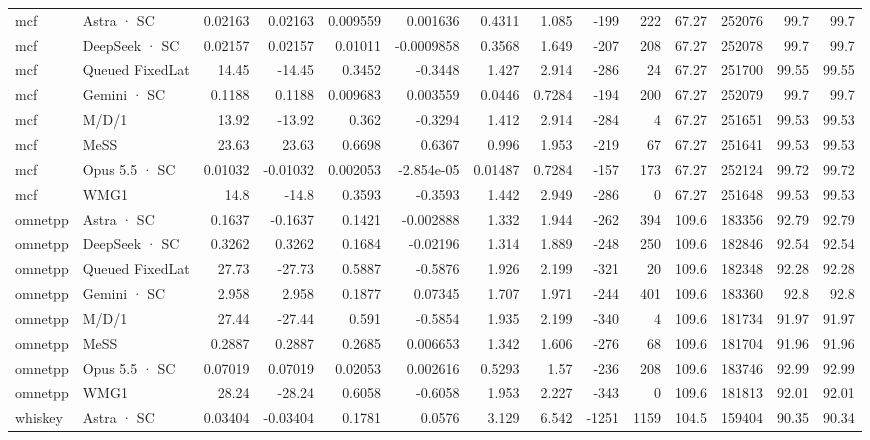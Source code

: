 \begin{tabular}{llrrrrrrrrrrrr}
mcf & Astra · SC & 0.02163 & 0.02163 & 0.009559 & 0.001636 & 0.4311 & 1.085 & -199 & 222 & 67.27 & 252076 & 99.7 & 99.7 \\
mcf & DeepSeek · SC & 0.02157 & 0.02157 & 0.01011 & -0.0009858 & 0.3568 & 1.649 & -207 & 208 & 67.27 & 252078 & 99.7 & 99.7 \\
mcf & Queued FixedLat & 14.45 & -14.45 & 0.3452 & -0.3448 & 1.427 & 2.914 & -286 & 24 & 67.27 & 251700 & 99.55 & 99.55 \\
mcf & Gemini · SC & 0.1188 & 0.1188 & 0.009683 & 0.003559 & 0.0446 & 0.7284 & -194 & 200 & 67.27 & 252079 & 99.7 & 99.7 \\
mcf & M/D/1 & 13.92 & -13.92 & 0.362 & -0.3294 & 1.412 & 2.914 & -284 & 4 & 67.27 & 251651 & 99.53 & 99.53 \\
mcf & MeSS & 23.63 & 23.63 & 0.6698 & 0.6367 & 0.996 & 1.953 & -219 & 67 & 67.27 & 251641 & 99.53 & 99.53 \\
mcf & Opus 5.5 · SC & 0.01032 & -0.01032 & 0.002053 & -2.854e-05 & 0.01487 & 0.7284 & -157 & 173 & 67.27 & 252124 & 99.72 & 99.72 \\
mcf & WMG1 & 14.8 & -14.8 & 0.3593 & -0.3593 & 1.442 & 2.949 & -286 & 0 & 67.27 & 251648 & 99.53 & 99.53 \\
omnetpp & Astra · SC & 0.1637 & -0.1637 & 0.1421 & -0.002888 & 1.332 & 1.944 & -262 & 394 & 109.6 & 183356 & 92.79 & 92.79 \\
omnetpp & DeepSeek · SC & 0.3262 & 0.3262 & 0.1684 & -0.02196 & 1.314 & 1.889 & -248 & 250 & 109.6 & 182846 & 92.54 & 92.54 \\
omnetpp & Queued FixedLat & 27.73 & -27.73 & 0.5887 & -0.5876 & 1.926 & 2.199 & -321 & 20 & 109.6 & 182348 & 92.28 & 92.28 \\
omnetpp & Gemini · SC & 2.958 & 2.958 & 0.1877 & 0.07345 & 1.707 & 1.971 & -244 & 401 & 109.6 & 183360 & 92.8 & 92.8 \\
omnetpp & M/D/1 & 27.44 & -27.44 & 0.591 & -0.5854 & 1.935 & 2.199 & -340 & 4 & 109.6 & 181734 & 91.97 & 91.97 \\
omnetpp & MeSS & 0.2887 & 0.2887 & 0.2685 & 0.006653 & 1.342 & 1.606 & -276 & 68 & 109.6 & 181704 & 91.96 & 91.96 \\
omnetpp & Opus 5.5 · SC & 0.07019 & 0.07019 & 0.02053 & 0.002616 & 0.5293 & 1.57 & -236 & 208 & 109.6 & 183746 & 92.99 & 92.99 \\
omnetpp & WMG1 & 28.24 & -28.24 & 0.6058 & -0.6058 & 1.953 & 2.227 & -343 & 0 & 109.6 & 181813 & 92.01 & 92.01 \\
whiskey & Astra · SC & 0.03404 & -0.03404 & 0.1781 & 0.0576 & 3.129 & 6.542 & -1251 & 1159 & 104.5 & 159404 & 90.35 & 90.34 \\

\end{tabular}
